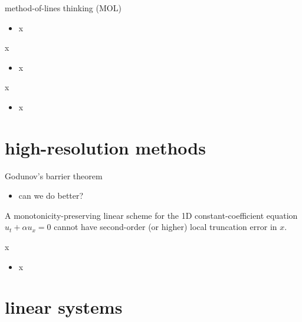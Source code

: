 \documentclass[10pt,hyperref]{beamer}
\begin{document}
\begin{frame}{method-of-lines thinking (MOL)}

\begin{itemize}
\item x
\end{itemize}
\end{frame}


\begin{frame}{x}

\begin{itemize}
\item x
\end{itemize}
\end{frame}


\begin{frame}{x}

\begin{itemize}
\item x
\end{itemize}
\end{frame}


\section{high-resolution methods}

\begin{frame}{Godunov's barrier theorem}

\begin{itemize}
\item can we do better?
\end{itemize}

\begin{theorem}  A monotonicity-preserving linear scheme for the 1D constant-coefficient equation $u_t + \alpha u_x=0$ cannot have second-order (or higher) local truncation error in $x$.\end{theorem}
\end{frame}

\begin{frame}{x}

\begin{itemize}
\item x
\end{itemize}
\end{frame}


\section{linear systems}
\end{document}
